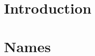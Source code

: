 \documentclass[10pt,a4paper,showtrims]{memoir}
\begin{document}
\begin{comment}
\end{comment}

% 
\mainmatter
\chapter{Introduction}

% 
% 
% 
\chapter{Names}

% 

\begin{comment}
\end{comment}
\end{document}
